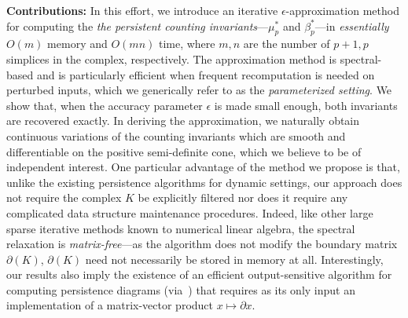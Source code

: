 \documentclass[12pt]{article}
\numberwithin{equation}{section}
\newcommand{\+}{%
	\raisebox{0.18ex}{\scaleobj{0.55}{+}}
}
\theoremstyle{definition}
\begin{document}
%
\noindent 
\textbf{Contributions: }
In this effort, we introduce an iterative $\epsilon$-approximation method for computing the \emph{the persistent counting invariants}---$\mu_p^{\ast}$ and $\beta_p^\ast$---in \emph{essentially} $O(m)$ memory and $O(mn)$ time, where $m, n$ are the number of $p+1, p$ simplices in the complex, respectively. 
The approximation method is spectral-based and is particularly efficient when frequent recomputation is needed on perturbed inputs, which we generically refer to as the \emph{parameterized setting}. 
We show that, when the accuracy parameter $\epsilon$ is made small enough, both invariants are recovered exactly. 
In deriving the approximation, we naturally obtain continuous variations of the counting invariants which are smooth and differentiable on the positive semi-definite cone, which we believe to be of independent interest. 
One particular advantage of the method we propose is that, unlike the existing persistence algorithms for dynamic settings, our approach does not require the complex $K$ be explicitly filtered nor does it require any complicated data structure maintenance procedures.
Indeed, like other large sparse iterative methods known to numerical linear algebra, the spectral relaxation is \emph{matrix-free}---as the algorithm does not modify the boundary matrix $\partial(K)$, $\partial(K)$ need not necessarily be stored in memory at all.
Interestingly, our results also imply the existence of an efficient output-sensitive algorithm for computing persistence diagrams (via~\cite{chen2011output}) that requires as its only input an implementation of a matrix-vector product $x \mapsto \partial x$. 
\end{document}
